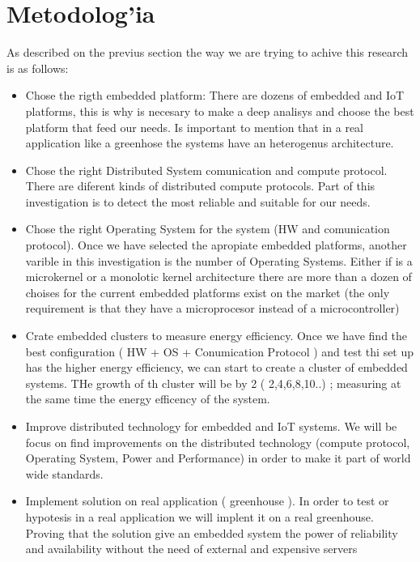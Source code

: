 \section{Metodolog'ia}
\noindent

As described on the previus section the way we are trying to achive this
research is as follows: 


\begin{itemize}
\item Chose the rigth embedded platform: There are dozens of embedded and IoT
    platforms, this is why is necesary to make a deep analisys and choose the
    best platform that feed our needs. Is important to mention that in a real
    application like a greenhose the systems have an heterogenus architecture.
\item Chose the right Distributed System comunication and compute protocol.
    There are diferent kinds of distributed compute protocols. Part of this
    investigation is to detect the most reliable and suitable for our needs.
\item Chose the right Operating System for the system (HW and comunication
    protocol). Once we have selected the apropiate embedded platforms, another 
    varible in this investigation is the number of Operating
    Systems. Either if is a microkernel or a monolotic kernel architecture
    there are more than a dozen of choises for the current embedded platforms
    exist on the market (the only requirement is that they have a microprocesor
    instead of a microcontroller)
\item Crate embedded clusters to measure energy efficiency. Once we have find
    the best configuration ( HW + OS + Conumication Protocol ) and test thi set
    up has the higher energy efficiency, we can start to create a cluster of
    embedded systems. THe growth of th cluster will be by 2 ( 2,4,6,8,10..) ;
    measuring at the same time the energy efficency of the system.
\item Improve distributed technology for embedded and IoT systems. We will be
    focus on find improvements on the distributed technology (compute
    protocol, Operating System, Power and Performance) in order to make it part
    of world wide standards.
\item Implement solution on real application ( greenhouse ). In order to test
    or hypotesis in a real application we will implent it on a real
    greenhouse. Proving that the solution give an embedded system the power of
    reliability and availability without the need of external and expensive servers 
\end{itemize}


\clearpage
